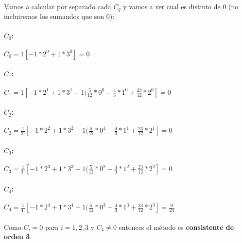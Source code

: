\documentclass[titlepage]{article}
\begin{document}
Vamos a calcular por separado cada $C_q$ y vamos a ver cual es distinto de 0 (no incluiremos los sumandos que son 0):

\paragraph{$C_0$:} $C_0 = 1[-1*2^0+1*3^0]=0$

\paragraph{$C_1$:} $C_1 = 1[-1*2^1+1*3^1 - 1(\frac{5}{12}*0^0 - \frac{4}{3}*1^0 + \frac{23}{12}*2^0] = 0$

\paragraph{$C_2$:} $C_2 = \frac{1}{2!}[-1*2^2+1*3^2 - 1(\frac{5}{12}*0^1 - \frac{4}{3}*1^1 + \frac{23}{12}*2^1] = 0$

\paragraph{$C_3$:} $C_3 = \frac{1}{3!}[-1*2^3+1*3^3 - 1(\frac{5}{12}*0^2 - \frac{4}{3}*1^2 + \frac{23}{12}*2^2] = 0$

\paragraph{$C_4$:} $C_4 = \frac{1}{4!}[-1*2^4+1*3^4 - 1(\frac{5}{12}*0^3 - \frac{4}{3}*1^3 + \frac{23}{12}*2^3] = \frac{9}{24}$

\paragraph{}Como $C_i = 0$ para $i=1,2,3$ y $C_4 \neq 0$ entonces el método es \textbf{consistente de orden 3}.
\end{document}
